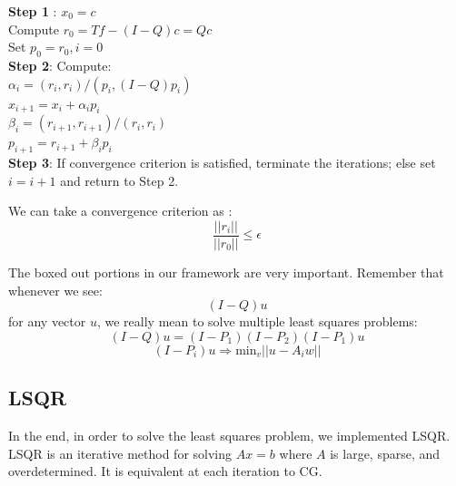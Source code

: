 \documentclass[a4paper,12pt]{article}
\begin{document}
\vspace{.2in}
 \noindent \textbf{Step 1} : $x_0 = c$ \\
\hspace{.5in} Compute $r_0 = Tf - \boxed{(I-Q)c} = Qc$\\
\hspace{.5in} Set $p_0 = r_0, i = 0$ \\
\textbf{Step 2}:  Compute: \\
\hspace{.5in} $\alpha_i = (r_i, r_i)/(p_i,\boxed{(I-Q)p_i})$ \\
\hspace{.5in} $ x_{i+1} = x_i + \alpha_i p_i $ \\
\hspace{.5in} $\beta_i = (r_{i+1}, r_{i+1})/(r_i, r_i) $ \\
\hspace{.5in} $p_{i+1} = r_{i+1} + \beta_i p _i $ \\
\textbf{Step 3}: If convergence criterion is satisfied, terminate the iterations; else set $i = i+1$ and return to Step 2.

 We can take a convergence criterion as : $$ \frac{ ||r_i||}{||r_0||} \leq \epsilon$$


The boxed out portions in our framework are very important. Remember that whenever we see: $$(I - Q) u$$ for any vector $u$, we really mean to solve multiple least squares problems:
$$(I-Q) u = (I-P_1)(I-P_2)(I-P_1) u $$
$$(I-P_i) u \Rightarrow \text{min}_{v} ||u-A_i w|| $$

\subsection{LSQR}
In the end, in order to solve the least squares problem, we implemented LSQR. LSQR is an iterative method for solving $Ax = b$ where $A$ is large, sparse, and overdetermined. It is equivalent at each iteration to CG. 
\end{document}
